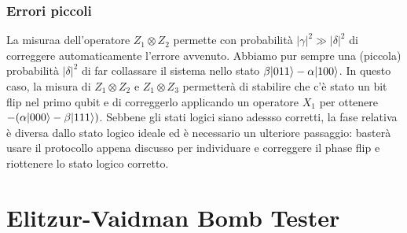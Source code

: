 \documentclass[12pt, a4paper]{report}
\begin{document}
\subsection{Errori piccoli}
La misuraa dell'operatore $Z_{1}\otimes Z_{2}$ permette con probabilità $\left|\gamma\right|^{2}\gg\left|\delta\right|^{2}$ di correggere automaticamente l'errore avvenuto. Abbiamo pur sempre una (piccola) probabilità $\left|\delta\right|^{2}$ di far collassare il sistema nello stato $\beta| 011 \rangle-\alpha| 100 \rangle$. In questo caso, la misura di $Z_{1}\otimes Z_{2}$ e $Z_{1}\otimes Z_{3}$ permetterà di stabilire che c'è stato un bit flip nel primo qubit e di correggerlo applicando un operatore $X_{1}$ per ottenere $-(\alpha| 000 \rangle-\beta| 111 \rangle)$. Sebbene gli stati logici siano adessso corretti, la fase relativa è diversa dallo stato logico ideale ed è necessario un ulteriore passaggio: basterà usare il protocollo appena discusso per individuare e correggere il phase flip e riottenere lo stato logico corretto.
\chapter{Elitzur-Vaidman Bomb Tester}
\end{document}
